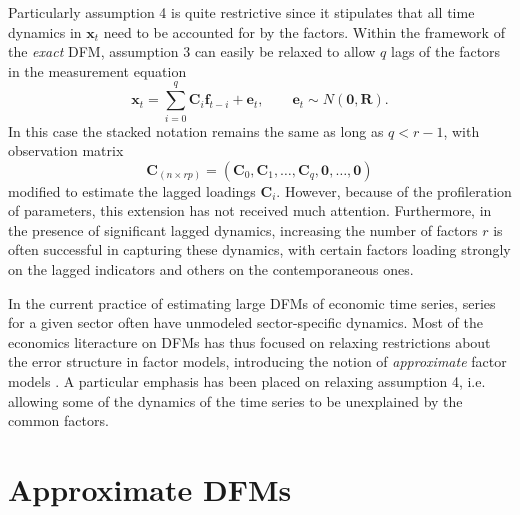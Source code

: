 \documentclass[a4paper]{article}
\begin{document}
Particularly assumption 4 is quite restrictive since it stipulates that all time dynamics in $\textbf{x}_t$ need to be accounted for by the factors. Within the framework of the \emph{exact} DFM, assumption 3 can easily be relaxed to allow $q$ lags of the factors in the measurement equation
\begin{equation}
\textbf{x}_t = \sum_{i=0}^q \textbf{C}_i \textbf{f}_{t-i} + \textbf{e}_t, \qquad \textbf{e}_t\sim N(\textbf{0}, \textbf{R}).
\end{equation}
In this case the stacked notation remains the same as long as $q < r-1$, with observation matrix 
\begin{equation} \label{eq:Clags}
\textbf{C}_{(n \times rp)}  = (\textbf{C}_0, \textbf{C}_1, \dots, \textbf{C}_q, \textbf{0}, \dots, \textbf{0})
\end{equation}
modified to estimate the lagged loadings $\textbf{C}_i$. However, because of the profileration of parameters, this extension has not received much attention. Furthermore, in the presence of significant lagged dynamics, increasing the number of factors $r$ is often successful in capturing these dynamics, with certain factors loading strongly on the lagged indicators and others on the contemporaneous ones. \newline


In the current practice of estimating large DFMs of economic time series, series for a given sector often have unmodeled sector-specific dynamics. Most of the economics literacture on DFMs has thus focused on relaxing restrictions about the error structure in factor models, introducing the notion of \emph{approximate} factor models \citep{stock2016dynamic}. A particular emphasis has been placed on relaxing assumption 4, i.e. allowing some of the dynamics of the time series to be unexplained by the common factors. 


\section{Approximate DFMs}
\end{document}
